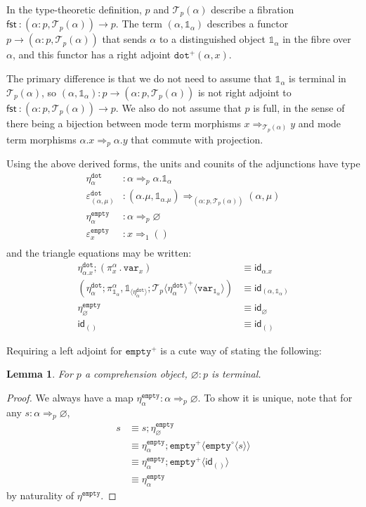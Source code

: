 \documentclass[10pt]{article}
\newtheorem{lemma}{Lemma}
\theoremstyle{definition}
\let\emptyset\varnothing
\newcommand\dsd[1]{\ensuremath{\mathsf{#1}}}
\newcommand{\tcell}{\Rightarrow}
\newcommand{\app}[2]{\ensuremath{#1 \: #2}}
\newcommand{\sigmacl}[3]{\ensuremath{(#1{:}#2,#3)}}
\newcommand{\fst}[1]{\app{\dsd{fst}}{#1}}
\newcommand{\id}{\mathsf{id}}
\newcommand\TrPlus[2]{\ensuremath{{#1}^+(#2)}}
\newcommand\El[2]{\mathcal{T}_{#1}(#2)}
\newcommand\ApEl[2]{\mathcal{T}_{#1}\langle#2\rangle}
\newcommand\bdot[0]{\mathbin{.}}
\newcommand\ApPlus[2]{\ensuremath{{#1}^+ \langle #2 \rangle }}
\newcommand\ApCirc[2]{\ensuremath{{#1}^\circ \langle #2 \rangle }}
\newcommand{\tdot}{\ensuremath{\mathtt{dot}}}
\newcommand{\tempty}{\ensuremath{\mathtt{empty}}}
\newcommand\One{\ensuremath{\mathds{1}}}
\newcommand\var[1]{\ensuremath{\mathtt{var}_{#1}}}
\newcommand\ApOne[1]{\ensuremath{\One_{\langle {#1} \rangle }}}
\begin{document}
In the type-theoretic definition, $p$ and $\El{p}{\alpha}$ describe a fibration $\fst : \sigmacl{\alpha}{p}{\El{p}{\alpha}} \to p$. The term $(\alpha, \One_\alpha)$ describes a functor $p \to \sigmacl{\alpha}{p}{\El{p}{\alpha}}$ that sends $\alpha$ to a distinguished object $\One_\alpha$ in the fibre over $\alpha$, and this functor has a right adjoint $\TrPlus{\tdot}{\alpha,x}$.

The primary difference is that we do not need to assume that $\One_\alpha$ is terminal in $\El{p}{\alpha}$, so $(\alpha, \One_\alpha) : p \to \sigmacl{\alpha}{p}{\El{p}{\alpha}}$ is not right adjoint to $\fst : \sigmacl{\alpha}{p}{\El{p}{\alpha}} \to p$. We also do not assume that $p$ is full, in the sense of there being a bijection between mode term morphisms $x \tcell_{\El{p}{\alpha}} y$ and mode term morphisms $\alpha.x \tcell_p \alpha.y$ that commute with projection.

Using the above derived forms, the units and counits of the adjunctions have type
\begin{align*}
\eta^\tdot_\alpha {}&: \alpha \tcell_p \alpha.\One_\alpha \\
\varepsilon^\tdot_{(\alpha, \mu)} {}&: (\alpha.\mu, \One_{\alpha.\mu}) \tcell_{\sigmacl{\alpha}{p}{\El{p}{\alpha}}} (\alpha, \mu) \\
\eta^\tempty_\alpha {}&: \alpha \tcell_p \emptyset \\
\varepsilon^\tempty_{x} {}&: x \tcell_1 () \\
\end{align*}
and the triangle equations may be written:
\begin{align}
\label{eq:chi-triangle-1} \eta^\tdot_{\alpha.x};(\pi_x^\alpha \bdot \var{x}) &\equiv \id_{\alpha.x} \\
\label{eq:chi-triangle-2} (\eta^\tdot_\alpha ; \pi^\alpha_{\One_\alpha}, \ApOne{\eta^\tdot_\alpha} ; \ApPlus{\ApEl{p}{\eta^\tdot_\alpha}}{\var{\One_\alpha}}) &\equiv \id_{(\alpha, \One_\alpha)}\\
\eta^\tempty_\emptyset &\equiv \id_\emptyset \\
\id_{()}&\equiv \id_{()}
\end{align}

Requiring a left adjoint for $\tempty^+$ is a cute way of stating the following:
\begin{lemma}
For $p$ a comprehension object, $\emptyset : p$ is terminal.
\end{lemma}
\begin{proof}
We always have a map $\eta^\tempty_\alpha : \alpha \tcell_p \emptyset$. To show it is unique, note that for any $s : \alpha \tcell_p \emptyset$,
\begin{align*}
s 
&\equiv s ; \eta^\tempty_\emptyset \\
&\equiv \eta^\tempty_\alpha ; \ApPlus{\tempty}{\ApCirc{\tempty}{s}} \\
&\equiv \eta^\tempty_\alpha ; \ApPlus{\tempty}{\id_{()}} \\
&\equiv \eta^\tempty_\alpha
\end{align*}
by naturality of $\eta^\tempty$.
\end{proof}
\end{document}
